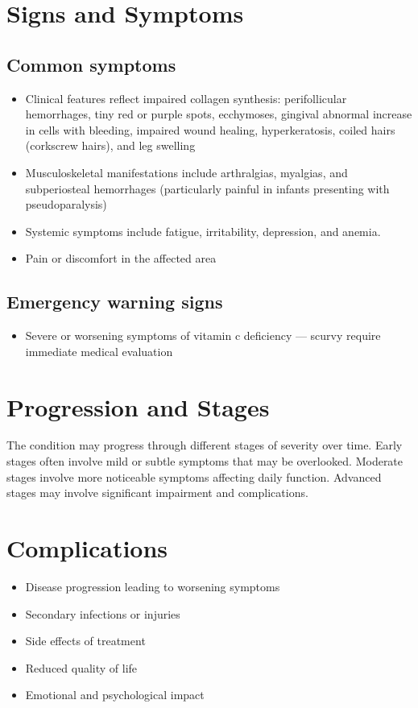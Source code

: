 \section{Signs and Symptoms}

\subsection{Common symptoms}
\begin{itemize}[noitemsep]
  \item Clinical features reflect impaired collagen synthesis: perifollicular hemorrhages, tiny red or purple spots, ecchymoses, gingival abnormal increase in cells with bleeding, impaired wound healing, hyperkeratosis, coiled hairs (corkscrew hairs), and leg swelling
  \item Musculoskeletal manifestations include arthralgias, myalgias, and subperiosteal hemorrhages (particularly painful in infants presenting with pseudoparalysis)
  \item Systemic symptoms include fatigue, irritability, depression, and anemia.
  \item Pain or discomfort in the affected area
  \end{itemize}

\subsection{Emergency warning signs}
\begin{itemize}[noitemsep]
  \item Severe or worsening symptoms of vitamin c deficiency --- scurvy require immediate medical evaluation
\end{itemize}
\section{Progression and Stages}
The condition may progress through different stages of severity over time. Early stages often involve mild or subtle symptoms that may be overlooked. Moderate stages involve more noticeable symptoms affecting daily function. Advanced stages may involve significant impairment and complications.
\section{Complications}
\begin{itemize}[noitemsep]
  \item Disease progression leading to worsening symptoms
  \item Secondary infections or injuries
  \item Side effects of treatment
  \item Reduced quality of life
  \item Emotional and psychological impact
\end{itemize}
